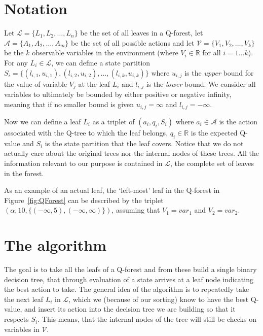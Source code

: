 \documentclass{article}
\begin{document}
\section{Notation}

Let $\mathcal{L} = \{ L_1, L_2, \ldots, L_n \}$ be the set of all leaves in a
Q-forest, let $\mathcal{A} = \{ A_1, A_2, \ldots, A_m \}$ be the set of all
possible actions and let $\mathcal{V} = \{ V_1, V_2, \ldots, V_k \}$ be the $k$
observable variables in the environment (where $V_i \in \mathbb{R}$ for all
$i=1\ldots k$). For any $L_i \in \mathcal{L}$, we can define a state partition
$S_i = \{ (l_{i,1}, u_{i,1}), (l_{i,2}, u_{i,2}), \ldots, (l_{i,k}, u_{i,k})\}$
where $u_{i,j}$ is the \textit{upper} bound for the value of variable $V_{j}$ at
the leaf $L_i$ and $l_{i,j}$ is the \textit{lower} bound. We consider all
variables to ultimately be bounded by either positive or negative infinity,
meaning that if no smaller bound is given $u_{i,j} = \infty$ and $l_{i,j} =
-\infty$.

Now we can define a leaf $L_i$ as a triplet of $(a_i, q_i, S_i)$ where $a_i \in
\mathcal{A}$ is the action associated with the Q-tree to which the leaf belongs,
$q_i \in \mathbb{R} $ is the expected Q-value and $S_i$ is the state partition
that the leaf covers. Notice that we do not actually care about the original
trees nor the internal nodes of these trees. All the information relevant to our
purpose is contained in $\mathcal{L}$, the complete set of leaves in the forest.

As an example of an actual leaf, the `left-most' leaf in the Q-forest in
Figure~\ref{fig:QForest} can be described by the triplet $(\alpha, 10, \{
(-\infty, 5), (-\infty, \infty)\})$, assuming that $V_1 = var_1$ and $V_2 =
var_2$.

\section{The algorithm}

The goal is to take all the leafs of a Q-forest and from these build a single
binary decision tree, that through evaluation of a state arrives at a leaf node
indicating the best action to take. The general idea of the algorithm is to
repeatedly take the next leaf $L_i$ in $\mathcal{L}$, which we (because of our
sorting) know to have the best Q-value, and insert its action into the decision
tree we are building so that it respects $S_i$. This means, that the internal
nodes of the tree will still be checks on variables in $\mathcal{V}$.
\end{document}
